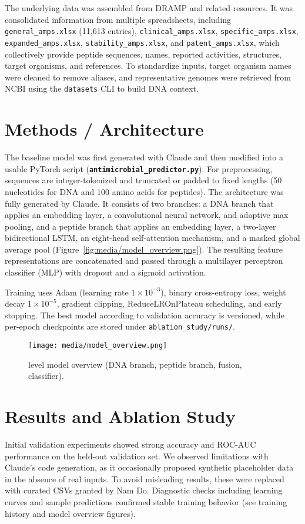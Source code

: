 \documentclass{article}
\begin{document}
The underlying data was assembled from DRAMP and related resources. It was consolidated information from multiple spreadsheets, including \texttt{general\_amps.xlsx} (11,613 entries), \texttt{clinical\_amps.xlsx}, \texttt{specific\_amps.xlsx}, \texttt{expanded\_amps.xlsx}, \texttt{stability\_amps.xlsx}, and \texttt{patent\_amps.xlsx}, which collectively provide peptide sequences, names, reported activities, structures, target organisms, and references. To standardize inputs, target organism names were cleaned to remove aliases, and representative genomes were retrieved from NCBI using the \texttt{datasets} CLI to build DNA context. 
\section{Methods / Architecture}

The baseline model was first generated with Claude and then modified into a usable PyTorch script (\textbf{\texttt{antimicrobial\_predictor.py}}). For preprocessing, sequences are integer-tokenized and truncated or padded to fixed lengths (50 nucleotides for DNA and 100 amino acids for peptides). The architecture was fully generated by Claude. It consists of two branches: a DNA branch that applies an embedding layer, a convolutional neural network, and adaptive max pooling, and a peptide branch that applies an embedding layer, a two-layer bidirectional LSTM, an eight-head self-attention mechanism, and a masked global average pool (Figure~\ref{fig:media/model_overview.png}). The resulting feature representations are concatenated and passed through a multilayer perceptron classifier (MLP) with dropout and a sigmoid activation.  

Training uses Adam (learning rate $1\times10^{-3}$), binary cross-entropy loss, weight decay $1\times10^{-5}$, gradient clipping, ReduceLROnPlateau scheduling, and early stopping. The best model according to validation accuracy is versioned, while per-epoch checkpoints are stored under \texttt{ablation\_study/runs/}.

\begin{figure}[htbp]
  \centering
  \texttt{[image: media/model\_overview.png]}
  \caption{level model overview (DNA branch, peptide branch, fusion, classifier).}
\end{figure}

\section{Results and Ablation Study}
Initial validation experiments showed strong accuracy and ROC-AUC performance on the held-out validation set. We observed limitations with Claude’s code generation, as it occasionally proposed synthetic placeholder data in the absence of real inputs. To avoid misleading results, these were replaced with curated CSVs granted by Nam Do. Diagnostic checks including learning curves and sample predictions confirmed stable training behavior (see training history and model overview figures).
\end{document}
